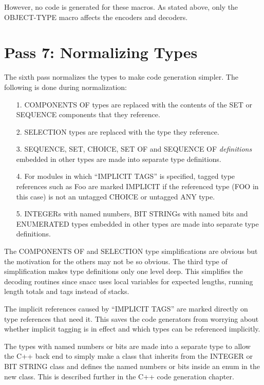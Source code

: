 However, no code is generated for these macros.  As stated above, only
the OBJECT-TYPE macro affects the encoders and decoders.

\section{\label{comp-pass7-section}Pass 7: Normalizing Types}
The sixth pass normalizes the types to make code generation simpler.
The following is done during normalization:
\begin{itemize}

\item[1.] { COMPONENTS OF types are replaced with the contents of the SET
or SEQUENCE components that they reference.}

\item[2.] { SELECTION types are replaced with the type they reference.}

\item[3.] { SEQUENCE, SET, CHOICE, SET OF and SEQUENCE OF {\em definitions}
embedded in other types are made into separate type definitions. }

\item[4.] { For modules in which ``IMPLICIT TAGS'' is specified, tagged
type references such as {\ASN [APPLICATION 2] Foo} are marked IMPLICIT
if the referenced type ({\ASN FOO} in this case) is not an untagged
CHOICE or untagged ANY type.}

\item[5.] { INTEGERs with named numbers, BIT STRINGs with named bits and
ENUMERATED types embedded in other types are made into separate type
definitions.}
\end{itemize}

The COMPONENTS OF and SELECTION type simplifications are obvious but
the motivation for the others may not be so obvious.  The third type of
simplification makes type definitions only one level deep.  This
simplifies the decoding routines since snacc uses local variables for
expected lengths, running length totals and tags instead of stacks.

The implicit references caused by ``IMPLICIT TAGS'' are marked
directly on type references that need it.  This saves the code
generators from worrying about whether implicit tagging is in effect
and which types can be referenced implicitly.

The types with named numbers or bits are made into a separate type to
allow the C++ back end to simply make a class that inherits from the
INTEGER or BIT STRING class and defines the named numbers or bits
inside an enum in the new class.  This is described further in the C++
code generation chapter.


